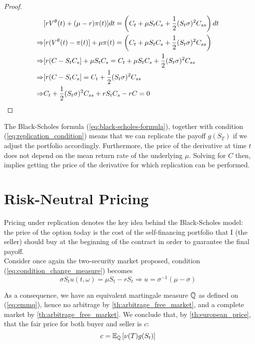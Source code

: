 \documentclass[../TGMAFFIRO.tex]{subfiles}
\begin{document}
\begin{proof}
	\begin{align}
		&[rV^\theta(t) + (\mu - r) \pi(t)] dt = \left(C_t + \mu S_t C_s + \frac{1}{2}(S_t\sigma)^2C_{ss} \right) dt\nonumber\\
		\Rightarrow & [r(V^\theta(t) - \pi(t)] + \mu\pi(t) = \left(C_t + \mu S_t C_s + \frac{1}{2}(S_t\sigma)^2C_{ss} \right) \nonumber\\
		\Rightarrow &[r(C - S_t C_s] + \mu S_t C_s = C_t + \mu S_t C_s + \frac{1}{2}(S_t\sigma)^2C_{ss} \nonumber \\
		\Rightarrow &[r(C - S_t C_s] = C_t + \frac{1}{2}(S_t\sigma)^2C_{ss} \nonumber \\
		\Rightarrow & C_t + \frac{1}{2}(S_t\sigma)^2C_{ss} + rS_t C_s - rC = 0
	\end{align}
 \end{proof}
 
 \begin{remark}
 	The Black-Scholes formula (\ref{eq:black-scholes-formula}), together with condition (\ref{eq:replication_condition}) means that we can replicate the payoff $g(S_T)$ if we adjust the portfolio accordingly. Furthermore, the price of the derivative at time $t$ does not depend on the mean return rate of the underlying $\mu$. Solving for $C$ then, implies getting the price of the derivative for which replication can be performed.
 \end{remark}
 
 \section{Risk-Neutral Pricing}
  Pricing under replication denotes the key idea behind the Black-Scholes model: the price of the option today is the cost of the self-financing portfolio that I (the seller) should buy at the beginning of the contract in order to guarantee the final payoff.\\
 
  Consider once again the two-security market proposed, condition (\ref{eq:condition_change_measure}) becomes
\[
	\sigma S_t u(t,\omega) = \mu S_t - r S_t \Rightarrow u = \sigma^{-1}(\mu - \sigma)
\]


As a consequence, we have an equivalent martingale measure $\mathbb{Q}$ as defined on (\ref{eq:emmq}), hence no arbitrage by \ref{th:arbitrage_free_market}, and a complete market by \ref{th:arbitrage_free_market}. We conclude that, by \ref{th:european_price}, that the fair price for both buyer and seller is $c$:
\begin{equation}
  c = \mathbb{E}_{\mathbb{Q}}\left[\nu(T)g(S_t)\right]
\end{equation}
\end{document}
